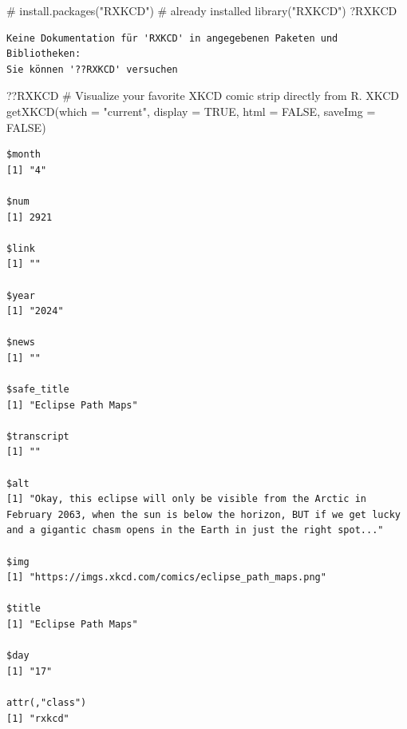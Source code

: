 \documentclass[
  letterpaper,
  DIV=11,
  numbers=noendperiod]{scrartcl}
\newenvironment{Shaded}{\begin{snugshade}}{\end{snugshade}}
\newcommand{\AttributeTok}[1]{\textcolor[rgb]{0.40,0.45,0.13}{#1}}
\newcommand{\CommentTok}[1]{\textcolor[rgb]{0.37,0.37,0.37}{#1}}
\newcommand{\ConstantTok}[1]{\textcolor[rgb]{0.56,0.35,0.01}{#1}}
\newcommand{\FunctionTok}[1]{\textcolor[rgb]{0.28,0.35,0.67}{#1}}
\newcommand{\NormalTok}[1]{\textcolor[rgb]{0.00,0.23,0.31}{#1}}
\newcommand{\StringTok}[1]{\textcolor[rgb]{0.13,0.47,0.30}{#1}}
\begin{document}
\begin{enumerate}
\begin{Shaded}
\begin{Highlighting}[]
\CommentTok{\# install.packages("RXKCD") \# already installed}
\FunctionTok{library}\NormalTok{(}\StringTok{"RXKCD"}\NormalTok{)}
\NormalTok{?RXKCD}
\end{Highlighting}
\end{Shaded}

\begin{verbatim}
Keine Dokumentation für 'RXKCD' in angegebenen Paketen und Bibliotheken:
Sie können '??RXKCD' versuchen
\end{verbatim}

\begin{Shaded}
\begin{Highlighting}[]
\NormalTok{??RXKCD }\CommentTok{\# Visualize your favorite XKCD comic strip directly from R. XKCD}
\FunctionTok{getXKCD}\NormalTok{(}\AttributeTok{which =} \StringTok{"current"}\NormalTok{, }\AttributeTok{display =} \ConstantTok{TRUE}\NormalTok{, }\AttributeTok{html =} \ConstantTok{FALSE}\NormalTok{, }\AttributeTok{saveImg =} \ConstantTok{FALSE}\NormalTok{)}
\end{Highlighting}
\end{Shaded}

\begin{verbatim}
$month
[1] "4"

$num
[1] 2921

$link
[1] ""

$year
[1] "2024"

$news
[1] ""

$safe_title
[1] "Eclipse Path Maps"

$transcript
[1] ""

$alt
[1] "Okay, this eclipse will only be visible from the Arctic in February 2063, when the sun is below the horizon, BUT if we get lucky and a gigantic chasm opens in the Earth in just the right spot..."

$img
[1] "https://imgs.xkcd.com/comics/eclipse_path_maps.png"

$title
[1] "Eclipse Path Maps"

$day
[1] "17"

attr(,"class")
[1] "rxkcd"
\end{verbatim}

  \begin{figure}[H]


\end{figure}
\end{enumerate}
\end{document}
